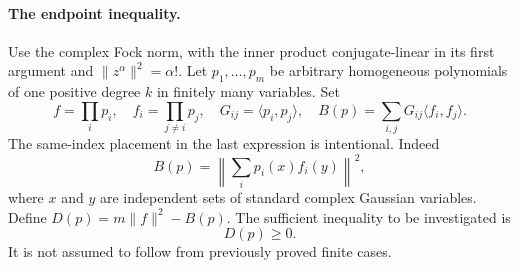 \documentclass[11pt]{article}
\begin{document}
\paragraph{The endpoint inequality.}
Use the complex Fock norm, with the inner product conjugate-linear in its
first argument and $\|z^\alpha\|^2=\alpha!$.
Let $p_1,\ldots,p_m$ be arbitrary homogeneous polynomials of one positive
degree $k$ in finitely many variables. Set
\[
 f=\prod_i p_i,\quad f_i=\prod_{j\ne i}p_j,\quad
 G_{ij}=\langle p_i,p_j\rangle,\quad
 B(p)=\sum_{i,j}G_{ij}\langle f_i,f_j\rangle.
\]
The same-index placement in the last expression is intentional. Indeed
\[
 B(p)=\left\|\sum_i p_i(x)f_i(y)\right\|^2,
\]
where $x$ and $y$ are independent sets of standard complex Gaussian
variables. Define $D(p)=m\|f\|^2-B(p)$.
The sufficient inequality to be investigated is
\begin{equation}\label{endpoint}
 D(p)\ge0.
\end{equation}
It is not assumed to follow from previously proved finite cases.
\end{document}

